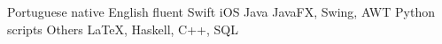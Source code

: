 \begin{cvskills}
  \cvskill
    {Portuguese}
    {native}
  \cvskill
    {English}
    {fluent}
  \cvskill
    {Swift}
    {iOS}
  \cvskill
    {Java}
    {JavaFX, Swing, AWT}
  \cvskill
    {Python}
    {scripts}
  \cvskill
    {Others}
    {\LaTeX, Haskell, C++, SQL}
\end{cvskills}
